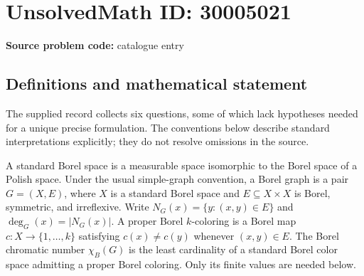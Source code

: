 \documentclass[11pt]{article}
\begin{document}
\section*{UnsolvedMath ID: 30005021}
\textbf{Source problem code:} catalogue entry
\subsection{Definitions and mathematical statement}
The supplied record collects six questions, some of which lack hypotheses needed for a unique precise formulation. The conventions below describe standard interpretations explicitly; they do not resolve omissions in the source.

A standard Borel space is a measurable space isomorphic to the Borel space of a Polish space. Under the usual simple-graph convention, a Borel graph is a pair \(G=(X,E)\), where \(X\) is a standard Borel space and \(E\subseteq X\times X\) is Borel, symmetric, and irreflexive. Write \(N_G(x)=\{y:(x,y)\in E\}\) and \(\deg_G(x)=|N_G(x)|\). A proper Borel \(k\)-coloring is a Borel map \(c:X\to\{1,\ldots,k\}\) satisfying \(c(x)\ne c(y)\) whenever \((x,y)\in E\). The Borel chromatic number \(\chi_B(G)\) is the least cardinality of a standard Borel color space admitting a proper Borel coloring. Only its finite values are needed below.
\end{document}

